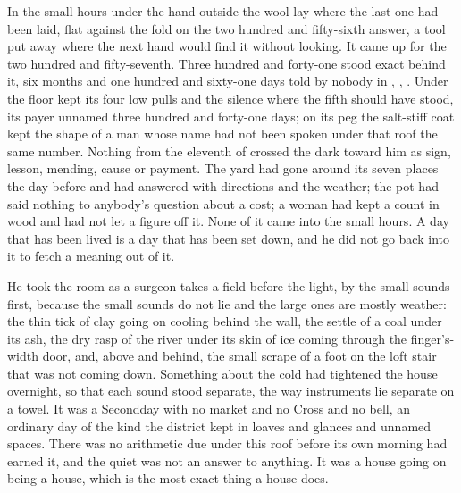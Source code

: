 
In the small hours under  the hand outside the wool lay where the last one had been laid, flat against the fold on the two hundred and fifty-sixth answer, a tool put away where the next hand would find it without looking. It came up for the two hundred and fifty-seventh. Three hundred and forty-one stood exact behind it, six months and one hundred and sixty-one days told by nobody in , , . Under the floor  kept its four low pulls and the silence where the fifth should have stood, its payer unnamed three hundred and forty-one days; on its peg the salt-stiff coat kept the shape of a man whose name had not been spoken under that roof the same number. Nothing from the eleventh of  crossed the dark toward him as sign, lesson, mending, cause or payment. The yard had gone around its seven places the day before and had answered with directions and the weather; the pot had said nothing to anybody's question about a cost; a woman had kept a count in wood and had not let a figure off it. None of it came into the small hours. A day that has been lived is a day that has been set down, and he did not go back into it to fetch a meaning out of it.

He took the room as a surgeon takes a field before the light, by the small sounds first, because the small sounds do not lie and the large ones are mostly weather: the thin tick of clay going on cooling behind the wall, the settle of a coal under its ash, the dry rasp of the river under its skin of ice coming through the finger's-width door, and, above and behind, the small scrape of a foot on the loft stair that was not coming down. Something about the cold had tightened the house overnight, so that each sound stood separate, the way instruments lie separate on a towel. It was a Secondday with no market and no Cross and no bell, an ordinary day of the kind the district kept in loaves and glances and unnamed spaces. There was no arithmetic due under this roof before its own morning had earned it, and the quiet was not an answer to anything. It was a house going on being a house, which is the most exact thing a house does.

